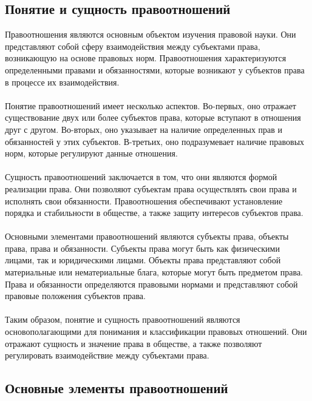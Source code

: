 \documentclass{article}
\begin{document}
\subsection{Понятие и сущность правоотношений}
Правоотношения являются основным объектом изучения правовой науки. Они представляют собой сферу взаимодействия между субъектами права, возникающую на основе правовых норм. Правоотношения характеризуются определенными правами и обязанностями, которые возникают у субъектов права в процессе их взаимодействия.\\
~\\
Понятие правоотношений имеет несколько аспектов. Во-первых, оно отражает существование двух или более субъектов права, которые вступают в отношения друг с другом. Во-вторых, оно указывает на наличие определенных прав и обязанностей у этих субъектов. В-третьих, оно подразумевает наличие правовых норм, которые регулируют данные отношения.\\
~\\
Сущность правоотношений заключается в том, что они являются формой реализации права. Они позволяют субъектам права осуществлять свои права и исполнять свои обязанности. Правоотношения обеспечивают установление порядка и стабильности в обществе, а также защиту интересов субъектов права.\\
~\\
Основными элементами правоотношений являются субъекты права, объекты права, права и обязанности. Субъекты права могут быть как физическими лицами, так и юридическими лицами. Объекты права представляют собой материальные или нематериальные блага, которые могут быть предметом права. Права и обязанности определяются правовыми нормами и представляют собой правовые положения субъектов права.\\
~\\
Таким образом, понятие и сущность правоотношений являются основополагающими для понимания и классификации правовых отношений. Они отражают сущность и значение права в обществе, а также позволяют регулировать взаимодействие между субъектами права.
\subsection{Основные элементы правоотношений}
\end{document}
